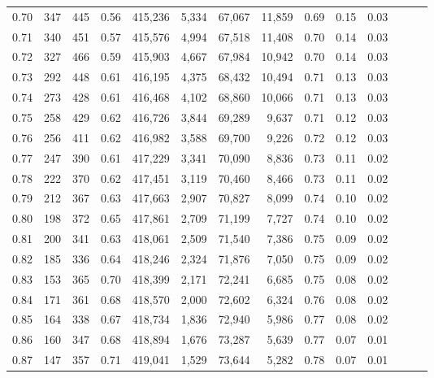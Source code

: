 \begin{tabular}{rrrrrrrrrrrrrr}
0.70 &     347 &    445 &  0.56 &  415,236 &    5,334 &  67,067 &  11,859 &  0.69 &  0.15 &      0.03 \\
0.71 &     340 &    451 &  0.57 &  415,576 &    4,994 &  67,518 &  11,408 &  0.70 &  0.14 &      0.03 \\
0.72 &     327 &    466 &  0.59 &  415,903 &    4,667 &  67,984 &  10,942 &  0.70 &  0.14 &      0.03 \\
0.73 &     292 &    448 &  0.61 &  416,195 &    4,375 &  68,432 &  10,494 &  0.71 &  0.13 &      0.03 \\
0.74 &     273 &    428 &  0.61 &  416,468 &    4,102 &  68,860 &  10,066 &  0.71 &  0.13 &      0.03 \\
0.75 &     258 &    429 &  0.62 &  416,726 &    3,844 &  69,289 &   9,637 &  0.71 &  0.12 &      0.03 \\
0.76 &     256 &    411 &  0.62 &  416,982 &    3,588 &  69,700 &   9,226 &  0.72 &  0.12 &      0.03 \\
0.77 &     247 &    390 &  0.61 &  417,229 &    3,341 &  70,090 &   8,836 &  0.73 &  0.11 &      0.02 \\
0.78 &     222 &    370 &  0.62 &  417,451 &    3,119 &  70,460 &   8,466 &  0.73 &  0.11 &      0.02 \\
0.79 &     212 &    367 &  0.63 &  417,663 &    2,907 &  70,827 &   8,099 &  0.74 &  0.10 &      0.02 \\
0.80 &     198 &    372 &  0.65 &  417,861 &    2,709 &  71,199 &   7,727 &  0.74 &  0.10 &      0.02 \\
0.81 &     200 &    341 &  0.63 &  418,061 &    2,509 &  71,540 &   7,386 &  0.75 &  0.09 &      0.02 \\
0.82 &     185 &    336 &  0.64 &  418,246 &    2,324 &  71,876 &   7,050 &  0.75 &  0.09 &      0.02 \\
0.83 &     153 &    365 &  0.70 &  418,399 &    2,171 &  72,241 &   6,685 &  0.75 &  0.08 &      0.02 \\
0.84 &     171 &    361 &  0.68 &  418,570 &    2,000 &  72,602 &   6,324 &  0.76 &  0.08 &      0.02 \\
0.85 &     164 &    338 &  0.67 &  418,734 &    1,836 &  72,940 &   5,986 &  0.77 &  0.08 &      0.02 \\
0.86 &     160 &    347 &  0.68 &  418,894 &    1,676 &  73,287 &   5,639 &  0.77 &  0.07 &      0.01 \\
0.87 &     147 &    357 &  0.71 &  419,041 &    1,529 &  73,644 &   5,282 &  0.78 &  0.07 &      0.01 \\

\end{tabular}
